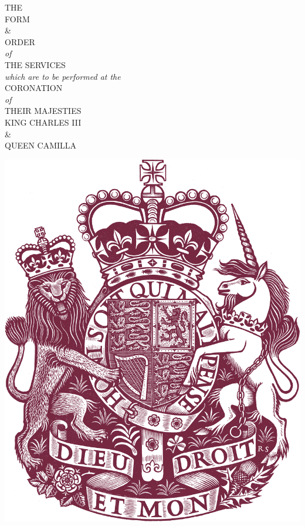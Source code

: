 \thispagestyle{empty}
\color{qred} 
\mbox{}\vfill
{\begin{center}

\LARGE  
{\scshape\MakeUppercase{The}}\\
{\scshape\MakeUppercase{Form}}\\ 
 \&\\{\scshape\MakeUppercase{Order}}\\
\normalfont\textit{of}\\
{\scshape\MakeUppercase{The Services}}\\
\normalfont\textit{which are to be performed at the}\\
{\scshape CORONATION}\\
 \textit{of}\\
\textsc{THEIR MAJESTIES}\\
KING CHARLES III\\
\&
\\
\textsc{QUEEN CAMILLA}

\vfill 

\includegraphics[width=.475\textwidth]{greatest-coa-qred.png}

\end{center}
\clearpage\mbox{}






\thispagestyle{empty}\clearpage


\vfill




\vfill {}
\vfill{}
\vfill 
{}

\vfill

\begin{center}
	\Large{}		\caslorn{24}		
\end{center}
\begin{center}
	\Large{}		\caslorn{24}		
\end{center}



}
